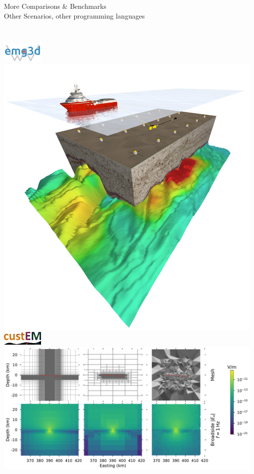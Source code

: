\documentclass[xcolor=svgnames, aspectratio=169]{beamer}
\begin{document}
\begin{frame}[c]%
  {More Comparisons \& Benchmarks\\
   Other Scenarios, other programming languages}
  \begin{columns}
    \centering
      ~\\[.5cm]
      \includegraphics[width=2.0cm]{Logo-emg3d}\\[.5cm]
      \includegraphics[width=\textwidth, trim=0 500 0 0, clip]{CSEM_Method3}\\[1cm]
      \includegraphics[width=2.0cm]{Logo-custEM}
    \centering
    \phantom{~}\\[.5cm]
    \includegraphics[width=\textwidth, trim=40 235 150 0, clip]{results-marlim_big}\\[.5cm]

\end{columns}
\end{frame}
\end{document}
